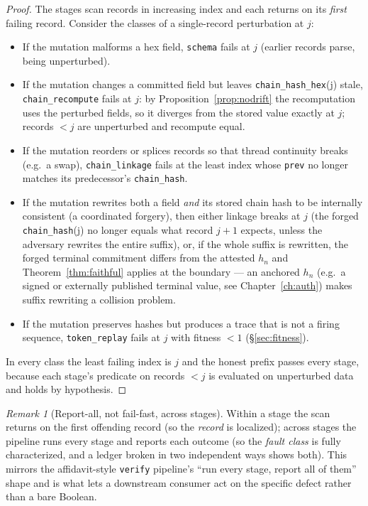 \documentclass[11pt,oneside]{book}
\theoremstyle{definition}
\theoremstyle{plain}
\theoremstyle{remark}
\newtheorem*{remark}{Remark}
\newcommand{\code}[1]{\texttt{#1}}
\begin{document}
\begin{proof}
The stages scan records in increasing index and each returns on its \emph{first} failing record. %
Consider the classes of a single-record perturbation at $j$: %
\begin{itemize}[leftmargin=*]
\item If the mutation malforms a hex field, \code{schema} fails at $j$ (earlier records parse,
being unperturbed). %
\item If the mutation changes a committed field but leaves \code{chain\_hash\_hex}(j) stale,
\code{chain\_recompute} fails at $j$: by Proposition~\ref{prop:nodrift} the recomputation uses the perturbed fields, so it diverges from the stored value exactly at $j$; records $<j$ are unperturbed and recompute equal. %
\item If the mutation reorders or splices records so that thread continuity breaks (e.g.\ a
swap), \code{chain\_linkage} fails at the least index whose \code{prev} no longer matches its predecessor's \code{chain\_hash}. %
\item If the mutation rewrites both a field \emph{and} its stored chain hash to be internally
consistent (a coordinated forgery), then either linkage breaks at $j$ (the forged \code{chain\_hash}(j) no longer equals what record $j{+}1$ expects, unless the adversary rewrites the entire suffix), or, if the whole suffix is rewritten, the forged terminal commitment differs from the attested $h_n$ and Theorem~\ref{thm:faithful} applies at the boundary --- an anchored $h_n$ (e.g.\ a signed or externally published terminal value, see Chapter~\ref{ch:auth}) makes suffix rewriting a collision problem. %
\item If the mutation preserves hashes but produces a trace that is not a firing sequence,
\code{token\_replay} fails at $j$ with fitness $<1$ (\S\ref{sec:fitness}). %
\end{itemize}
In every class the least failing index is $j$ and the honest prefix passes every stage, because each stage's predicate on records $<j$ is evaluated on unperturbed data and holds by hypothesis. %
\end{proof} %

\begin{remark}[Report-all, not fail-fast, across stages]
Within a stage the scan returns on the first offending record (so the \emph{record} is localized); across stages the pipeline runs every stage and reports each outcome (so the \emph{fault class} is fully characterized, and a ledger broken in two independent ways shows both). %
This mirrors the affidavit-style \code{verify} pipeline's ``run every stage, report all of them'' shape and is what lets a downstream consumer act on the specific defect rather than a bare Boolean. %
\end{remark}
\end{document}
